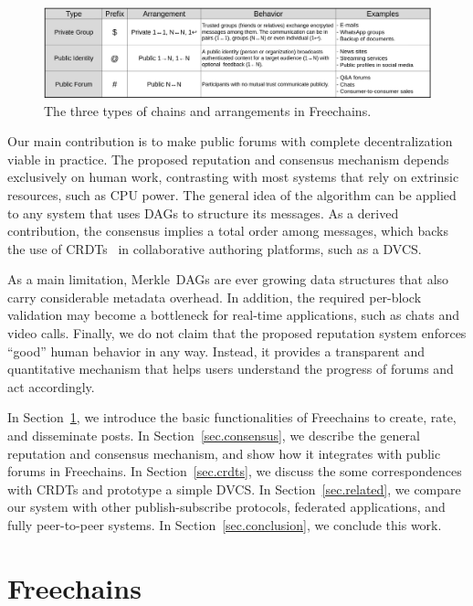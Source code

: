 \documentclass[10pt,journal,compsoc]{IEEEtran}
\newcommand{\FC}       {Freechains\xspace}
\begin{document}
\begin{figure}
\centering
\includegraphics[width=\textwidth]{arrangements.png}
\caption{The three types of chains and arrangements in \FC.}
\label{fig.table}
\end{figure}

Our main contribution is to make public forums with complete decentralization
viable in practice.
The proposed reputation and consensus mechanism depends exclusively on human
work, contrasting with most systems that rely on extrinsic resources, such as
CPU power.
The general idea of the algorithm can be applied to any system that uses DAGs
to structure its messages.
As a derived contribution, the consensus implies a total order among messages,
which backs the use of CRDTs~\cite{p2p.merkle-crdts} in collaborative authoring
platforms, such as a DVCS.

As a main limitation, Merkle~DAGs are ever growing data structures that also
carry considerable metadata overhead.
In addition, the required per-block validation may become a bottleneck for
real-time applications, such as chats and video calls.
%
Finally, we do not claim that the proposed reputation system enforces ``good''
human behavior in any way.
Instead, it provides a transparent and quantitative mechanism that helps users
understand the progress of forums and act accordingly.

In Section~\ref{sec.freechains}, we introduce the basic functionalities of \FC
to create, rate, and disseminate posts.
In Section~\ref{sec.consensus}, we describe the general reputation and
consensus mechanism, and show how it integrates with public forums in \FC.
In Section~\ref{sec.crdts}, we discuss the some correspondences with CRDTs and
prototype a simple DVCS.
In Section~\ref{sec.related}, we compare our system with other
publish-subscribe protocols, federated applications, and fully
peer-to-peer systems.
In Section~\ref{sec.conclusion}, we conclude this work.

\section{Freechains}
\label{sec.freechains}
\end{document}
